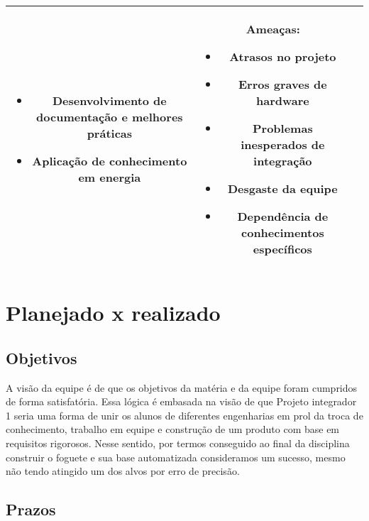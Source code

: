 \begin{table}[H]
\begin{tabular}{|c|c|c|}
{{\begin{itemize}
			\item Desenvolvimento de documentação e melhores práticas
			\item Aplicação de conhecimento em energia
        \end{itemize} }} & 
    {\parbox{0.4\textwidth}{ Ameaças:
        \\
        \begin{itemize}
            \item Atrasos no projeto
            \item Erros graves de hardware
			\item Problemas inesperados de integração
			\item Desgaste da equipe
			\item Dependência de conhecimentos específicos
        \end{itemize} }}\\ \hline
\end{tabular}
\label{tab:swot}
\end{table}


\section{Planejado x realizado}
\subsection{Objetivos}

A visão da equipe é de que os objetivos da matéria e da equipe foram cumpridos de forma satisfatória. Essa lógica é embasada na visão de que Projeto integrador 1 seria uma forma de unir os alunos de diferentes engenharias em prol da troca de conhecimento, trabalho em equipe e construção de um produto com base em requisitos rigorosos. Nesse sentido, por termos conseguido ao final da disciplina construir o foguete e sua base automatizada consideramos um sucesso, mesmo não tendo atingido um dos alvos por erro de precisão. 

\subsection{Prazos}


